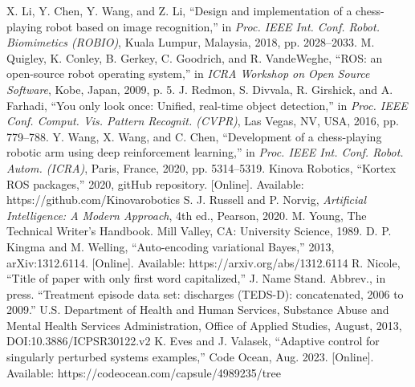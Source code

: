 \documentclass[conference]{IEEEtran}
\begin{document}
\begin{thebibliography}{00}
 X. Li, Y. Chen, Y. Wang, and Z. Li, ``Design and implementation of a chess-playing robot based on image recognition,'' in \textit{Proc. IEEE Int. Conf. Robot. Biomimetics (ROBIO)}, Kuala Lumpur, Malaysia, 2018, pp. 2028--2033.
 M. Quigley, K. Conley, B. Gerkey, C. Goodrich, and R. VandeWeghe, ``ROS: an open-source robot operating system,'' in \textit{ICRA Workshop on Open Source Software}, Kobe, Japan, 2009, p. 5.
 J. Redmon, S. Divvala, R. Girshick, and A. Farhadi, ``You only look once: Unified, real-time object detection,'' in \textit{Proc. IEEE Conf. Comput. Vis. Pattern Recognit. (CVPR)}, Las Vegas, NV, USA, 2016, pp. 779--788.
 Y. Wang, X. Wang, and C. Chen, ``Development of a chess-playing robotic arm using deep reinforcement learning,'' in \textit{Proc. IEEE Int. Conf. Robot. Autom. (ICRA)}, Paris, France, 2020, pp. 5314--5319.
 Kinova Robotics, ``Kortex ROS packages,'' 2020, gitHub repository. [Online]. Available: https://github.com/Kinovarobotics
 S. J. Russell and P. Norvig, \textit{Artificial Intelligence: A Modern Approach}, 4th ed., Pearson, 2020.
 M. Young, The Technical Writer's Handbook. Mill Valley, CA: University Science, 1989.
 D. P. Kingma and M. Welling, ``Auto-encoding variational Bayes,'' 2013, arXiv:1312.6114. [Online]. Available: https://arxiv.org/abs/1312.6114
 R. Nicole, ``Title of paper with only first word capitalized,'' J. Name Stand. Abbrev., in press.
 ``Treatment episode data set: discharges (TEDS-D): concatenated, 2006 to 2009.'' U.S. Department of Health and Human Services, Substance Abuse and Mental Health Services Administration, Office of Applied Studies, August, 2013, DOI:10.3886/ICPSR30122.v2
 K. Eves and J. Valasek, ``Adaptive control for singularly perturbed systems examples,'' Code Ocean, Aug. 2023. [Online]. Available: https://codeocean.com/capsule/4989235/tree
\end{thebibliography}
\end{document}
